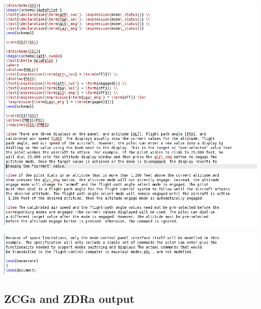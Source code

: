 \noindent \includegraphics[scale=0.5]{examples/semiform/1n2b.png}

\noindent \includegraphics[scale=0.5]{examples/semiform/1n2c.png}
%
\subsection{ZCGa and ZDRa output}

